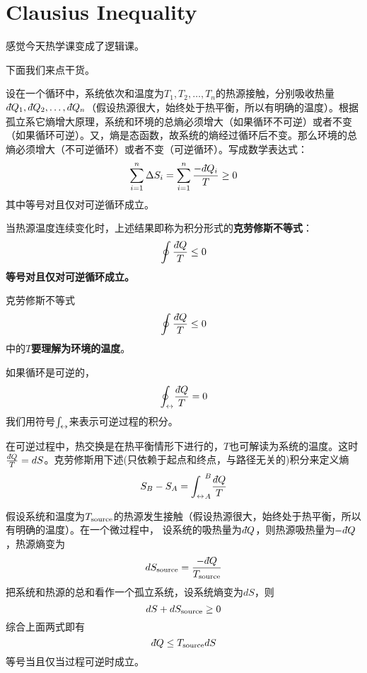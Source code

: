 \documentclass[CJK]{beamer}
\begin{document}
\section{Clausius Inequality}

\begin{frame}
\bch
\wulian 感觉今天热学课变成了逻辑课。

\skiplines

下面我们来点干货。
\ech
\end{frame}

\begin{frame}
\bch
设在一个循环中，系统依次和温度为$T_1, T_2, \ldots, T_n$的热源接触，分别吸收热量$\dbar Q_1, \dbar Q_2, \ldots, \dbar Q_n$（假设热源很大，始终处于热平衡，所以有明确的温度）。根据孤立系它熵增大原理，系统和环境的总熵必须增大（如果循环不可逆）或者不变（如果循环可逆）。又，熵是态函数，故系统的熵经过循环后不变。那么环境的总熵必须增大（不可逆循环）或者不变（可逆循环）。写成数学表达式：
$$\sum_{i=1}^n \Delta S_i = \sum_{i=1}^n \frac{-\dbar Q_i}{T} \ge 0$$
其中等号对且仅对可逆循环成立。

当热源温度连续变化时，上述结果即称为积分形式的{\bf 克劳修斯不等式}：
{\blue $$\oint \frac{\dbar Q}{T} \le 0 $$}
{\bf 等号对且仅对可逆循环成立。}

\ech
\end{frame}

\begin{frame}
\bch
克劳修斯不等式
{\blue $$\oint \frac{\dbar Q}{T} \le 0 $$}
中的{\bf $T$要理解为环境的温度}。

如果循环是可逆的，
$$\roint \frac{\dbar Q}{T} = 0$$
我们用符号${\int_\leftrightarrow}$来表示可逆过程的积分。

在可逆过程中，热交换是在热平衡情形下进行的，$T$也可解读为系统的温度。这时$\frac{\dbar Q}{T} = dS$。克劳修斯用下述(只依赖于起点和终点，与路径无关的)积分来定义熵
$$S_B-S_A = \rint_A^B \frac{\dbar Q}{T} $$

\ech
\end{frame}

\begin{frame}
\bch
假设系统和温度为$T_{\rm source}$的热源发生接触（假设热源很大，始终处于热平衡，所以有明确的温度）。在一个微过程中，
设系统的吸热量为$\dbar Q$，则热源吸热量为$-\dbar Q$，热源熵变为
$$ dS_{\rm source} = \frac{-\dbar Q}{T_{\rm source}}$$
把系统和热源的总和看作一个孤立系统，设系统熵变为$dS$，则
$$dS +dS_{\rm source} \ge 0$$
综合上面两式即有
$$\dbar Q \le T_{\rm source} dS $$
等号当且仅当过程可逆时成立。
\ech
\end{frame}
\end{document}

